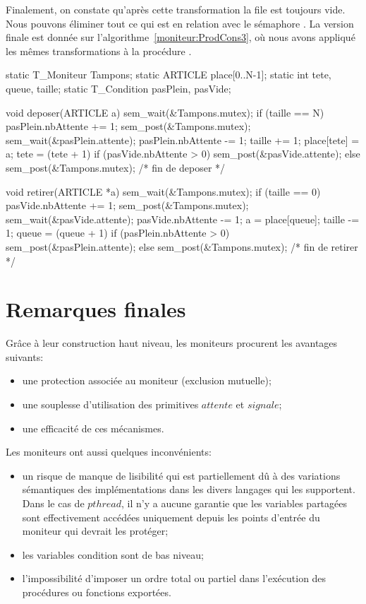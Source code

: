 Finalement, on constate qu'après cette transformation la file  est toujours vide. Nous pouvons éliminer tout ce qui est en relation avec le sémaphore . La version finale est donnée sur l'algorithme~\ref{moniteur:ProdCons3},  où nous avons appliqué les mêmes transformations à la procédure .

\begin{codeblock}[title=Problème des producteurs et des consommateurs à un tampon (version finale),label=moniteur:ProdCons3]
static T_Moniteur Tampons;
static ARTICLE place[0..N-1];
static int tete, queue, taille;
static T_Condition pasPlein, pasVide;

void deposer(ARTICLE a) {
  sem_wait(&Tampons.mutex);
  if (taille == N) {
     pasPlein.nbAttente += 1;
     sem_post(&Tampons.mutex);
     sem_wait(&pasPlein.attente);
     pasPlein.nbAttente -= 1;
  }
  taille += 1;
  place[tete] = a;
  tete = (tete + 1) %
  if (pasVide.nbAttente > 0)
     sem_post(&pasVide.attente);
  else
     sem_post(&Tampons.mutex);
} /* fin de deposer */

void retirer(ARTICLE *a) {
  sem_wait(&Tampons.mutex);
  if (taille == 0) {
     pasVide.nbAttente += 1;
     sem_post(&Tampons.mutex);
     sem_wait(&pasVide.attente);
     pasVide.nbAttente -= 1;
  }
  a = place[queue];
  taille -= 1;
  queue = (queue + 1) %
  if (pasPlein.nbAttente > 0)
     sem_post(&pasPlein.attente);
  else
     sem_post(&Tampons.mutex);
} /* fin de retirer */
\end{codeblock}

\section{Remarques finales}
Grâce à leur construction haut niveau, les moniteurs procurent les avantages suivants:
\begin{itemize}
\item une protection associée au moniteur (exclusion mutuelle);
\item une souplesse d'utilisation des primitives $attente$ et $signale$;
\item une efficacité de ces mécanismes.
\end{itemize}
Les moniteurs ont aussi quelques inconvénients:
\begin{itemize}
\item un risque de manque de lisibilité qui est partiellement dû à des variations sémantiques des implémentations dans les divers langages qui les supportent. Dans le cas de $pthread$, il n'y a aucune garantie que les variables partagées sont effectivement accédées uniquement depuis les points d'entrée du moniteur qui devrait les protéger;
\item les variables condition sont de bas niveau;
\item l'impossibilité d'imposer un ordre total ou partiel dans l'exécution des procédures ou fonctions exportées.
\end{itemize}


